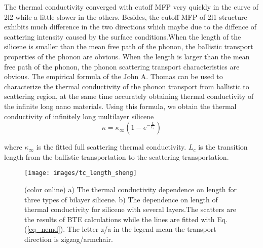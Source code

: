 \documentclass[%
 reprint,
 amsmath,amssymb,
 aps,
 prb,
]{revtex4-1}
\begin{document}
The thermal conductivity converged with cutoff MFP very quickly in the curve of 2l2 while a little slower in the others. Besides, the cutoff MFP of 2l1 structure exhibits much difference in the two directions  which maybe due to the diffence of scattering intensity caused by the surface conditions.When the length of the silicene is smaller than the mean free path of the phonon, the ballistic transport properties of the phonon are obvious. When the length is larger than the mean free path of the phonon, the phonon scattering transport characteristics are obvious. The empirical formula of the John A. Thomas\cite{Thomas2010} can be used to characterize the thermal conductivity of the phonon transport from ballistic to scattering region, at the same time accurately obtaining thermal conductivity of the infinite long nano materials. Using this formula, we obtain the thermal conductivity of infinitely long multilayer silicene
\begin{equation}
  \kappa = \kappa_\infty (1-e^{-\frac{L}{L_c}}) \label{eq:eq_nemd}
\end{equation}

where $\kappa_\infty$ is the fitted full scattering thermal conductivity. $L_c$ is the transition length from the ballistic transportation to the scattering transportation.

\begin{figure}[b]
  \texttt{[image: images/tc\_length\_sheng]}
  \caption{\label{fig:tc_length_sheng} (color online) a) The thermal conductivity dependence on length for three types of bilayer silicene. b) The dependence on length of thermal conductivity for silicene with several layers.The scatters are the results of BTE calculations while the lines are fitted with Eq.(\ref{eq_nemd}). The letter z/a in the legend mean the transport direction is zigzag/armchair.}
\end{figure}
\end{document}
